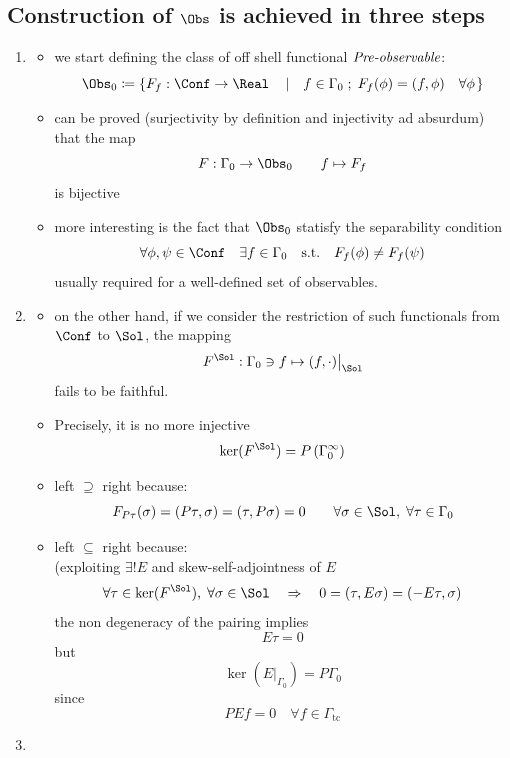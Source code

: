 \documentclass[a4paper,11pt]{scrartcl}
\begin{document}
	\subsection{Construction of $\Obs$ is achieved in three steps}
	\begin{enumerate}
		\item 
			\begin{itemize}
				\item we start defining the class of off shell functional $\emph{Pre-observable}$:
					$$\Obs_0 \coloneqq \left\{ F_f:\Conf \rightarrow \Real \quad \left\vert \quad f \in \Gamma_0 \; ; \; F_f(\phi) = (f,\phi) \quad\forall \phi \right. \right\}$$
				\item can be proved (surjectivity by definition and injectivity ad absurdum) that the map
				$$F: \Gamma_0 \rightarrow \Obs_0 \qquad f \mapsto F_f$$
				is bijective
				\item more interesting is the fact that $\Obs_0$ statisfy the separability condition
				$$ \forall \phi, \psi \in \Conf \quad \exists f \in \Gamma_0 \quad \textrm{s.t.} \quad F_f(\phi) \neq F_f(\psi)$$
				usually required for a well-defined set of observables.
			\end{itemize}
		\item
			\begin{itemize}
				\item on the other hand, if we consider the restriction of such functionals from $\Conf$ to $\Sol$,
				the mapping 
				$$ F^\Sol : \Gamma_0  \ni f \mapsto (f,\cdot) \big\vert_\Sol $$
				fails to be faithful.
				\item Precisely,  it is no more injective
				$$ \ker(F^\Sol) = P \left( \Gamma_0^\infty \right)$$
				\item left $\supseteq$ right because:
				$$ F_{P\tau} ( \sigma ) = ( P\tau, \sigma ) = (\tau , P\sigma) = 0 \qquad \forall \sigma \in \Sol , \; \forall \tau \in \Gamma_0$$
				\item left $\subseteq$ right because: \\
				(exploiting $\exists ! E$ and skew-self-adjointness of $E$
				$$ \forall \tau \in \ker(F^\Sol) , \; \forall \sigma \in \Sol \quad \Rightarrow \quad 0 = ( \tau , E \sigma) = (-E\tau, \sigma)$$
				the non degeneracy of the pairing implies
				$$ E\tau = 0$$
				but
				$$ \ker(E\vert_{\Gamma_0}) = P\Gamma_0 $$
				since
				$$ PE f = 0 \quad \forall f \in \Gamma_\textrm{tc} $$
			\end{itemize}
		\item
			\begin{itemize}

\end{itemize}
\end{enumerate}
\end{document}
